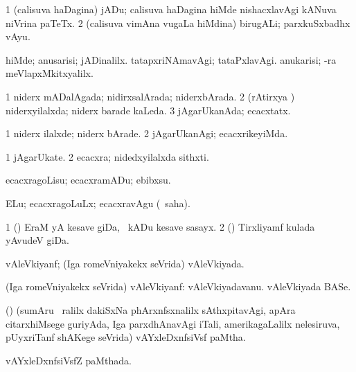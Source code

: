 \bentry
{} 
\gl{\nA}
\expl{}
\bmng
\bnum
\num{1} (calisuva haDagina) jADu; calisuva haDagina hiMde nishacxlavAgi kANuva niVrina paTeTx. 
\num{2} (calisuva vimAna \mo vugaLa hiMdina) birugALi; parxkuSxbadhx vAyu. 
\enum
\emng

\noindent 
\gl{\pagu}
\expl{}
\bmng
{} 
\banum
{} hiMde; anusarisi; jADinalilx. 
 tatapxriNAmavAgi; tataPxlavAgi. 
 anukarisi; -ra meVlapxMkitxyalilx. 
\eanum
\emng
\eentry

\bentry
{}
\gl{\gu}
\expl{}
\bmng
\bnum
\num{1} niderx mADalAgada; nidirxsalArada; niderxbArada. 
\num{2} (rAtirxya \vi) niderxyilalxda; niderx barade kaLeda. 
\num{3} jAgarUkanAda; ecacxtatx. 
\enum
\emng
\eentry

\bentry
{} 
\gl{\kirxvi}
\expl{}
\bmng
\bnum
\num{1} niderx ilalxde; niderx bArade. 
\num{2} jAgarUkanAgi; ecacxrikeyiMda. 
\enum
\emng
\eentry

\bentry
{} 
\gl{\nA}
\expl{}
\bmng
\bnum
\num{1} jAgarUkate. 
\num{2} ecacxra; nidedxyilalxda sithxti. 
\enum
\emng
\eentry

\bentry
{} 
\gl{\akirx}
\expl{}
\bmng
ecacxragoLisu; ecacxramADu; ebibxsu. 
\emng

\noindent 
\gl{\akirx}
\expl{}
\bmng
ELu; ecacxragoLuLx; ecacxravAgu (\rUpa\ saha). 
\emng
\eentry

\bentry
{} 
\gl{\nA}
\expl{}
\bmng
\bnum
\num{1} (\birx) EraM yA kesave giDa, \kanmu\ kADu kesave sasayx. 
\num{2} (\ame) Tirxliyamf kulada yAvudeV giDa. 
\enum
\emng
\eentry

\bentry
{} 
\gl{\gu}
\expl{}
\bmng
vAleVkiyanf; (Iga romeVniyakekx seVrida) vAleVkiyada. 
\emng
\eentry

\bentry
{} 
\gl{\nA}
\expl{}
\bmng
(Iga romeVniyakekx seVrida) vAleVkiyanf: 
\banum
{} vAleVkiyadavanu. 
 vAleVkiyada BASe. 
\eanum
\emng
\eentry

\bentry
{} 
\gl{\nA}
\expl{}
\bmng
(\bava) (sumAru \kirxsha\ ralilx dakiSxNa phArxnfsxnalilx sAthxpitavAgi, apAra citarxhiMsege guriyAda, Iga parxdhAnavAgi iTali, amerikagaLalilx nelesiruva, pUyxriTanf shAKege seVrida) vAYxleDxnfsiVsf paMtha. 
\emng
\eentry

\bentry
{} 
\gl{\gu}
\expl{}
\bmng
vAYxleDxnfsiVsfZ paMthada. 
\emng
\eentry

